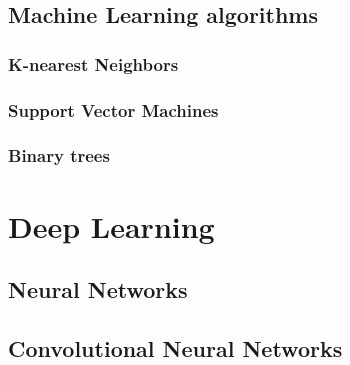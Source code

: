 
\subsection{Machine Learning algorithms}\label{ch:ml_algs}
\subsubsection{K-nearest Neighbors}
\subsubsection{Support Vector Machines}
\subsubsection{Binary trees}

\section{Deep Learning}
\subsection{Neural Networks}
\subsection{Convolutional Neural Networks}

